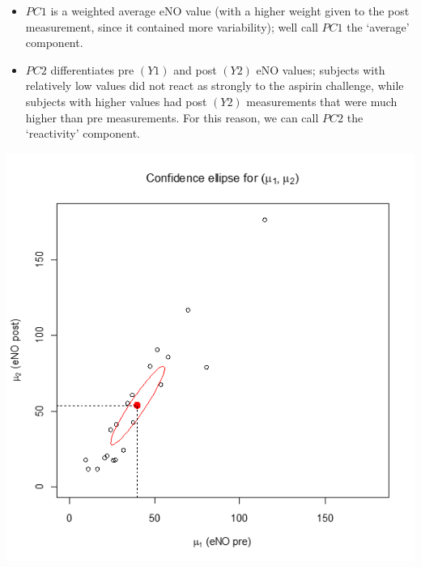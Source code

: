 \documentclass[
  9pt,
  ignorenonframetext,
]{beamer}
\begin{document}
\begin{frame}{}
\protect\hypertarget{section-12}{}
\begin{itemize}
\item
  \(PC1\) is a weighted average eNO value (with a higher weight given to
  the post measurement, since it contained more variability); well call
  \(PC1\) the `average' component.
\item
  \(PC2\) differentiates pre \((Y1)\) and post \((Y2)\) eNO values;
  subjects with relatively low values did not react as strongly to the
  aspirin challenge, while subjects with higher values had post \((Y2)\)
  measurements that were much higher than pre measurements. For this
  reason, we can call \(PC2\) the `reactivity' component.
\end{itemize}

\tiny

\begin{center}\includegraphics[width=0.6\linewidth]{figs_L2/L2-f19} \end{center}

\tiny
\end{frame}
\end{document}
